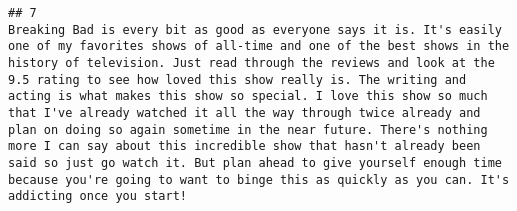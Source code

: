 \documentclass[
]{article}
\begin{document}
\begin{verbatim}
## 7                                                                                                                                                                                                                                                                                                                                                                                                                                                                                                                                                                                                                                                                                                                                                                                                                                                                                                                                                                                                                                                                                                                                                                                                                                                                                                                                                                                                                                                                           Breaking Bad is every bit as good as everyone says it is. It's easily one of my favorites shows of all-time and one of the best shows in the history of television. Just read through the reviews and look at the 9.5 rating to see how loved this show really is. The writing and acting is what makes this show so special. I love this show so much that I've already watched it all the way through twice already and plan on doing so again sometime in the near future. There's nothing more I can say about this incredible show that hasn't already been said so just go watch it. But plan ahead to give yourself enough time because you're going to want to binge this as quickly as you can. It's addicting once you start!

\end{verbatim}
\end{document}
